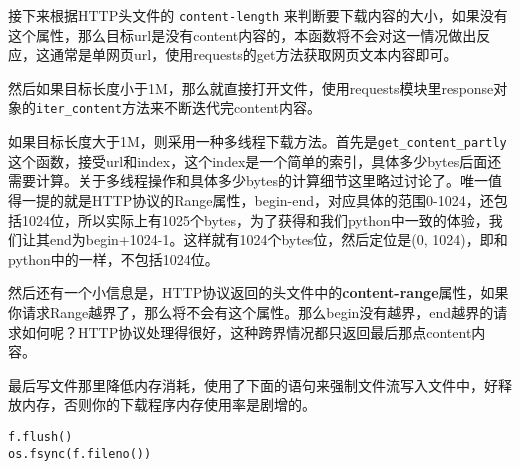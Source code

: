 \documentclass[12pt,oneside]{book}
\begin{document}
\begin{common-format}
接下来根据HTTP头文件的 \verb+content-length+ 来判断要下载内容的大小，如果没有这个属性，那么目标url是没有content内容的，本函数将不会对这一情况做出反应，这通常是单网页url，使用requests的get方法获取网页文本内容即可。

然后如果目标长度小于1M，那么就直接打开文件，使用requests模块里response对象的\verb+iter_content+方法来不断迭代完content内容。

如果目标长度大于1M，则采用一种多线程下载方法。首先是\verb+get_content_partly+这个函数，接受url和index，这个index是一个简单的索引，具体多少bytes后面还需要计算。关于多线程操作和具体多少bytes的计算细节这里略过讨论了。唯一值得一提的就是HTTP协议的Range属性，begin-end，对应具体的范围0-1024，还包括1024位，所以实际上有1025个bytes，为了获得和我们python中一致的体验，我们让其end为begin+1024-1。这样就有1024个bytes位，然后定位是(0, 1024)，即和python中的一样，不包括1024位。

然后还有一个小信息是，HTTP协议返回的头文件中的\textbf{content-range}属性，如果你请求Range越界了，那么将不会有这个属性。那么begin没有越界，end越界的请求如何呢？HTTP协议处理得很好，这种跨界情况都只返回最后那点content内容。

最后写文件那里降低内存消耗，使用了下面的语句来强制文件流写入文件中，好释放内存，否则你的下载程序内存使用率是剧增的。
\begin{Verbatim}
f.flush()
os.fsync(f.fileno())
\end{Verbatim}


\end{common-format}
\end{document}
